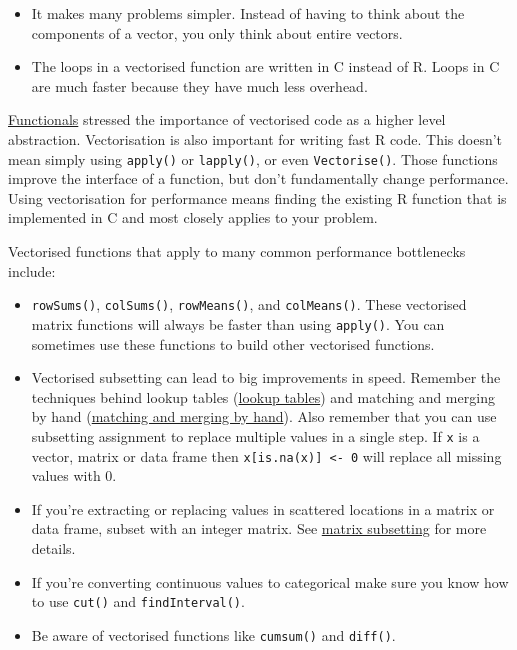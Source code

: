 \begin{itemize}
\item
  It makes many problems simpler. Instead of having to think about the
  components of a vector, you only think about entire vectors.
\item
  The loops in a vectorised function are written in C instead of R.
  Loops in C are much faster because they have much less overhead.
\end{itemize}

\protect\hyperlink{functionals}{Functionals} stressed the importance of
vectorised code as a higher level abstraction. Vectorisation is also
important for writing fast R code. This doesn't mean simply using
\texttt{apply()} or \texttt{lapply()}, or even \texttt{Vectorise()}.
Those functions improve the interface of a function, but don't
fundamentally change performance. Using vectorisation for performance
means finding the existing R function that is implemented in C and most
closely applies to your problem.

Vectorised functions that apply to many common performance bottlenecks
include:

\begin{itemize}
\item
  \texttt{rowSums()}, \texttt{colSums()}, \texttt{rowMeans()}, and
  \texttt{colMeans()}. These vectorised matrix functions will always be
  faster than using \texttt{apply()}. You can sometimes use these
  functions to build other vectorised functions.

\begin{Shaded}
\begin{Highlighting}[]
\StringTok{ }\OperatorTok{>}\StringTok{ }
\StringTok{ }\OperatorTok{==}\StringTok{ }
\end{Highlighting}
\end{Shaded}
\item
  Vectorised subsetting can lead to big improvements in speed. Remember
  the techniques behind lookup tables
  (\protect\hyperlink{lookup-tables}{lookup tables}) and matching and
  merging by hand (\protect\hyperlink{matching-merging}{matching and
  merging by hand}). Also remember that you can use subsetting
  assignment to replace multiple values in a single step. If \texttt{x}
  is a vector, matrix or data frame then
  \texttt{x{[}is.na(x){]}\ \textless{}-\ 0} will replace all missing
  values with 0.
\item
  If you're extracting or replacing values in scattered locations in a
  matrix or data frame, subset with an integer matrix. See
  \protect\hyperlink{matrix-subsetting}{matrix subsetting} for more
  details.
\item
  If you're converting continuous values to categorical make sure you
  know how to use \texttt{cut()} and \texttt{findInterval()}.
\item
  Be aware of vectorised functions like \texttt{cumsum()} and
  \texttt{diff()}.
\end{itemize}

